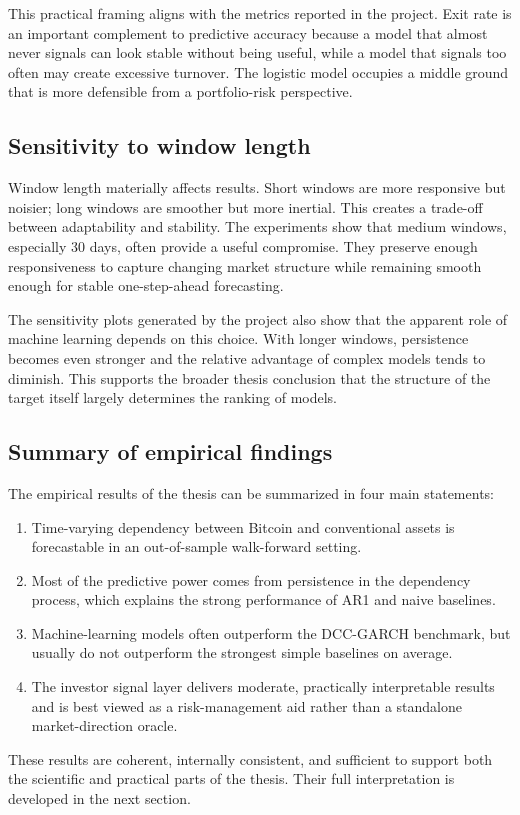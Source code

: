 This practical framing aligns with the metrics reported in the project. Exit rate is an important complement to predictive accuracy because a model that almost never signals can look stable without being useful, while a model that signals too often may create excessive turnover. The logistic model occupies a middle ground that is more defensible from a portfolio-risk perspective.

\subsection{Sensitivity to window length}

Window length materially affects results. Short windows are more responsive but noisier; long windows are smoother but more inertial. This creates a trade-off between adaptability and stability. The experiments show that medium windows, especially 30 days, often provide a useful compromise. They preserve enough responsiveness to capture changing market structure while remaining smooth enough for stable one-step-ahead forecasting.

The sensitivity plots generated by the project also show that the apparent role of machine learning depends on this choice. With longer windows, persistence becomes even stronger and the relative advantage of complex models tends to diminish. This supports the broader thesis conclusion that the structure of the target itself largely determines the ranking of models.

\subsection{Summary of empirical findings}

The empirical results of the thesis can be summarized in four main statements:

\begin{enumerate}
    \item Time-varying dependency between Bitcoin and conventional assets is forecastable in an out-of-sample walk-forward setting.
    \item Most of the predictive power comes from persistence in the dependency process, which explains the strong performance of AR1 and naive baselines.
    \item Machine-learning models often outperform the DCC-GARCH benchmark, but usually do not outperform the strongest simple baselines on average.
    \item The investor signal layer delivers moderate, practically interpretable results and is best viewed as a risk-management aid rather than a standalone market-direction oracle.
\end{enumerate}

These results are coherent, internally consistent, and sufficient to support both the scientific and practical parts of the thesis. Their full interpretation is developed in the next section.
